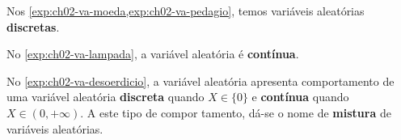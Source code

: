 Nos \cref{exp:ch02-va-moeda,exp:ch02-va-pedagio}, temos variáveis aleatórias
\textbf{discretas}.

No \cref{exp:ch02-va-lampada}, a variável aleatória é \textbf{contínua}.

No \cref{exp:ch02-va-desoerdicio}, a variável aleatória apresenta
comportamento de uma variável aleatória \textbf{discreta} quando $X \in \{0\}$
e \textbf{contínua} quando $X \in \left(0, +\infty\right)$. A este tipo de
compor tamento, dá-se o nome de \textbf{mistura} de variáveis aleatórias.
